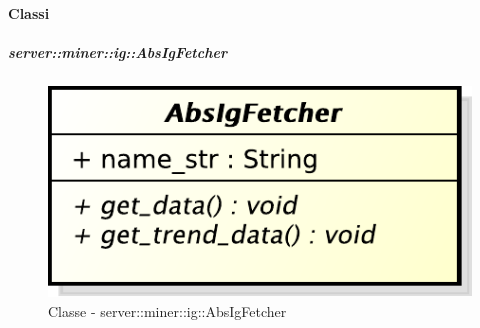 	\paragraph{Classi} %
	\subparagraph{server::miner::ig::AbsIgFetcher} %
		\label{subp:server_miner_ig_AbsIgFetcher}
		    \begin{figure}[!htbp]
 		 		\centering
 				\centerline{\includegraphics[scale=0.75]{./images/server/classes/miner/abs_ig_fetcher.pdf}}
 				\caption{Classe - server::miner::ig::AbsIgFetcher}
			\end{figure}
